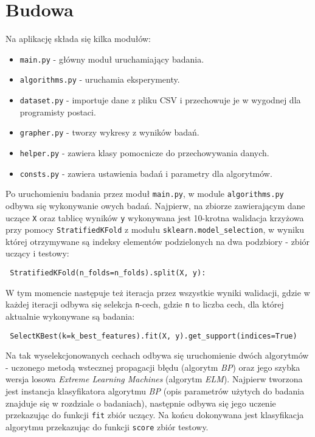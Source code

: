 \section{Budowa}

Na aplikację składa się kilka modułów:

\begin{itemize}
    \item \texttt{main.py} - główny moduł uruchamiający badania.
    \item \texttt{algorithms.py} - uruchamia eksperymenty.
    \item \texttt{dataset.py} - importuje dane z pliku CSV i przechowuje je w wygodnej dla programisty postaci.
    \item \texttt{grapher.py} - tworzy wykresy z wyników badań.
    \item \texttt{helper.py} - zawiera klasy pomocnicze do przechowywania danych.
    \item \texttt{consts.py} - zawiera ustawienia badań i parametry dla algorytmów.
\end{itemize}

Po uruchomieniu badania przez moduł \texttt{main.py}, w module \texttt{algorithms.py} odbywa się wykonywanie owych badań. Najpierw, na zbiorze zawierającym dane uczące \texttt{X} oraz tablicę wyników \texttt{y} wykonywana jest 10-krotna walidacja krzyżowa przy pomocy \texttt{StratifiedKFold} z modułu \texttt{sklearn.model\_selection}, w wyniku której otrzymywane są indeksy elementów podzielonych na dwa podzbiory - zbiór uczący i testowy:

\begin{verbatim}
 StratifiedKFold(n_folds=n_folds).split(X, y):
\end{verbatim}

W tym momencie następuje też iteracja przez wszystkie wyniki walidacji, gdzie w każdej iteracji odbywa się selekcja \texttt{n}-cech, gdzie \texttt{n} to liczba cech, dla której aktualnie wykonywane są badania:

\begin{verbatim}
 SelectKBest(k=k_best_features).fit(X, y).get_support(indices=True)
\end{verbatim}

Na tak wyselekcjonowanych cechach odbywa się uruchomienie dwóch algorytmów - uczonego metodą wstecznej propagacji błędu (algorytm \textit{BP}) oraz jego szybka wersja losowa \textit{Extreme Learning Machines} (algorytm \textit{ELM}). Najpierw tworzona jest instancja klasyfikatora algorytmu \textit{BP} (opis parametrów użytych do badania znajduje się w rozdziale o badaniach), następnie odbywa się jego uczenie przekazując do funkcji \texttt{fit} zbiór uczący. Na końcu dokonywana jest klasyfikacja algorytmu przekazując do funkcji \texttt{score} zbiór testowy.

